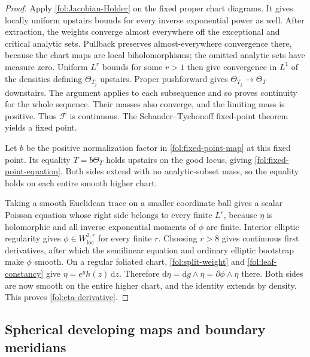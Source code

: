 \documentclass[11pt,letterpaper]{article}
\newcommand{\dd}{\mathrm{d}}
\theoremstyle{definition}
\theoremstyle{remark}
\begin{document}
\begin{proof}
Apply \eqref{fol:Jacobian-Holder} on the fixed proper chart diagrams.
It gives locally uniform upstairs bounds for every inverse exponential
power as well.  After extraction, the weights converge almost everywhere
off the exceptional and critical analytic sets.  Pullback preserves
almost-everywhere convergence there, because the chart maps are local
biholomorphisms; the omitted analytic sets have measure zero.
Uniform $L^r$ bounds for some $r>1$ then give convergence in $L^1$
of the densities defining $\Theta_{T_j}$ upstairs.  Proper
pushforward gives $\Theta_{T_j}\to\Theta_T$ downstairs.  The argument
applies to each subsequence and so proves continuity for the whole
sequence.  Their masses also converge, and the limiting mass is positive.
Thus $\mathcal F$ is continuous.  The Schauder--Tychonoff fixed-point
theorem yields a fixed point.

Let $b$ be the positive normalization factor in
\eqref{fol:fixed-point-map} at this fixed point.  Its equality
$T=b\Theta_T$ holds upstairs on the good locus, giving
\eqref{fol:fixed-point-equation}.  Both sides extend with no
analytic-subset mass, so the equality holds on each entire smooth
higher chart.

Taking a smooth Euclidean trace on a smaller coordinate ball gives a
scalar Poisson equation whose right side belongs to every finite $L^r$,
because $\eta$ is holomorphic and all inverse exponential moments of
$\phi$ are finite.  Interior elliptic regularity gives
$\phi\in W^{2,r}_{\mathrm{loc}}$ for every finite $r$.
Choosing $r>8$ gives continuous first derivatives, after which the
semilinear equation and ordinary elliptic bootstrap make $\phi$ smooth.
On a regular foliated chart,
\eqref{fol:split-weight} and \eqref{fol:leaf-constancy} give
$\eta=e^g h(z)\,\dd z$.  Therefore
$\dd\eta=\dd g\wedge\eta=\partial\phi\wedge\eta$ there.
Both sides are now smooth on the entire higher chart, and the identity
extends by density.  This proves \eqref{fol:eta-derivative}.
\end{proof}

\subsection{Spherical developing maps and boundary meridians}
\end{document}
